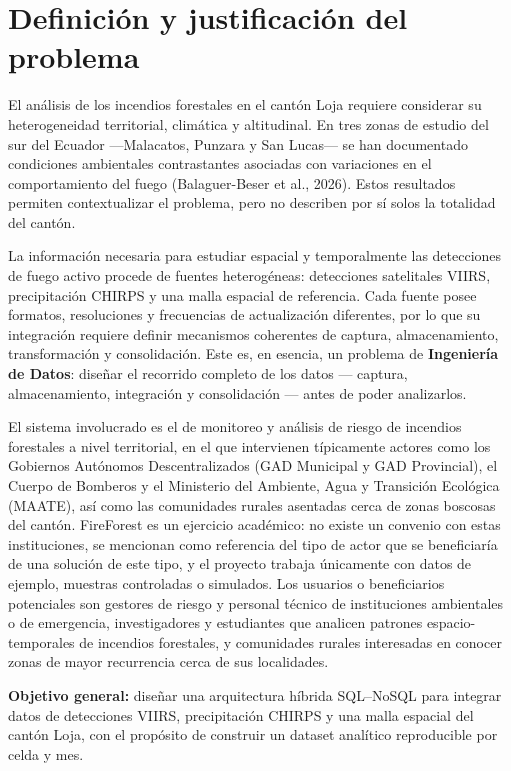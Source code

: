 \documentclass[11pt,a4paper]{article}
\begin{document}
\section{Definici\'on y justificaci\'on del problema}

El an\'alisis de los incendios forestales en el cant\'on Loja requiere considerar su heterogeneidad territorial, clim\'atica y altitudinal. En tres zonas de estudio del sur del Ecuador ---Malacatos, Punzara y San Lucas--- se han documentado condiciones ambientales contrastantes asociadas con variaciones en el comportamiento del fuego (Balaguer-Beser et al., 2026). Estos resultados permiten contextualizar el problema, pero no describen por s\'i solos la totalidad del cant\'on.

La informaci\'on necesaria para estudiar espacial y temporalmente las detecciones de fuego activo procede de fuentes heterog\'eneas: detecciones satelitales VIIRS, precipitaci\'on CHIRPS y una malla espacial de referencia. Cada fuente posee formatos, resoluciones y frecuencias de actualizaci\'on diferentes, por lo que su integraci\'on requiere definir mecanismos coherentes de captura, almacenamiento, transformaci\'on y consolidaci\'on. Este es, en esencia, un problema de \textbf{Ingenier\'ia de Datos}: dise\~nar el recorrido completo de los datos --- captura, almacenamiento, integraci\'on y consolidaci\'on --- antes de poder analizarlos.

El sistema involucrado es el de monitoreo y an\'alisis de riesgo de incendios forestales a nivel territorial, en el que intervienen t\'ipicamente actores como los Gobiernos Aut\'onomos Descentralizados (GAD Municipal y GAD Provincial), el Cuerpo de Bomberos y el Ministerio del Ambiente, Agua y Transici\'on Ecol\'ogica (MAATE), as\'i como las comunidades rurales asentadas cerca de zonas boscosas del cant\'on. FireForest es un ejercicio acad\'emico: no existe un convenio con estas instituciones, se mencionan como referencia del tipo de actor que se beneficiar\'ia de una soluci\'on de este tipo, y el proyecto trabaja \'unicamente con datos de ejemplo, muestras controladas o simulados. Los usuarios o beneficiarios potenciales son gestores de riesgo y personal t\'ecnico de instituciones ambientales o de emergencia, investigadores y estudiantes que analicen patrones espacio-temporales de incendios forestales, y comunidades rurales interesadas en conocer zonas de mayor recurrencia cerca de sus localidades.

\textbf{Objetivo general:} dise\~nar una arquitectura h\'ibrida SQL--NoSQL para integrar datos de detecciones VIIRS, precipitaci\'on CHIRPS y una malla espacial del cant\'on Loja, con el prop\'osito de construir un dataset anal\'itico reproducible por celda y mes.
\end{document}
